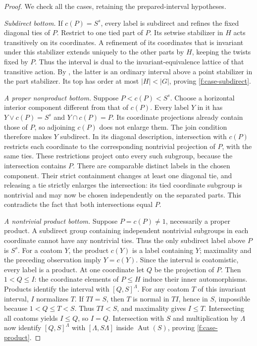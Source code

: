 \begin{proof}
We check all the cases, retaining the prepared-interval hypotheses.

\emph{Subdirect bottom.}
If $c(P)=S^s$, every label is subdirect and refines the fixed diagonal ties
of $P$. Restrict to one tied part of $P$. Its setwise stabilizer in $H$
acts transitively on its coordinates. A refinement of its coordinates
that is invariant under this stabilizer extends uniquely to the other
parts by $H$, keeping the twists fixed by $P$. Thus the interval is dual
to the invariant-equivalence lattice of that transitive action. By
, the latter is an ordinary interval above a point
stabilizer in the part stabilizer. Its top has order at most $|H|<|G|$,
proving \ref{f:case-subdirect}.

\emph{A proper nonproduct bottom.}
Suppose $P<c(P)<S^s$. Choose a horizontal interior component different from
that of $c(P)$. Every label $Y$ in it has
$Y\vee c(P)=S^s$ and $Y\cap c(P)=P$. Its coordinate projections already
contain those of $P$, so adjoining $c(P)$ does not enlarge them. The join
condition therefore makes $Y$ subdirect. In its diagonal description,
intersection with $c(P)$ restricts each coordinate to the corresponding
nontrivial projection of $P$, with the same ties. These restrictions
project onto every such subgroup, because the intersection contains $P$.
There are comparable distinct labels in the chosen component. Their
strict containment changes at least one diagonal tie, and releasing a tie
strictly enlarges the intersection: its tied coordinate subgroup is
nontrivial and may now be chosen independently on the separated parts.
This contradicts the fact that both intersections equal $P$.

\emph{A nontrivial product bottom.}
Suppose $P=c(P)\ne1$, necessarily a proper product. A subdirect group
containing independent nontrivial subgroups in each coordinate cannot
have any nontrivial ties. Thus the only subdirect label above $P$ is
$S^s$. For a coatom $Y$, the product $c(Y)$ is a label containing $Y$;
maximality and the preceding observation imply $Y=c(Y)$. Since the
interval is coatomistic, every label is a product.
At one coordinate let $Q$ be the projection of $P$. Then
$1<Q\le I$: the coordinate elements of $P\le H$ induce their inner
automorphisms. Products identify the interval with $[Q,S]^\Lambda$.
For any coatom $T$ of this invariant interval, $I$ normalizes $T$.
If $TI=S$, then $T$ is normal in $TI$, hence in $S$, impossible because
$1<Q\le T<S$. Thus $TI<S$, and maximality gives $I\le T$.
Intersecting all coatoms yields $I\le Q$, so $I=Q$.
Intersection with $S$ and multiplication by $\Lambda$ now identify
$[Q,S]^\Lambda$ with $[\Lambda,S\Lambda]$ inside
$\operatorname{Aut}(S)$, proving \ref{f:case-product}.


\end{proof}
